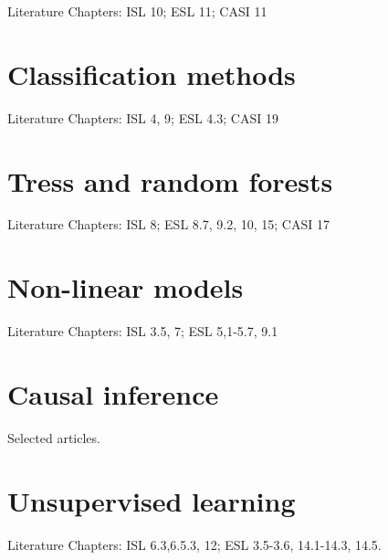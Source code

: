 \documentclass[11pt,a4paper]{article}
\begin{document}
Literature Chapters: ISL 10; ESL 11; CASI 11

\section{Classification methods}

Literature Chapters: ISL 4, 9; ESL 4.3; CASI 19

\section{Tress and random forests}

Literature Chapters: ISL 8; ESL 8.7, 9.2, 10, 15; CASI 17

\section{Non-linear models}

Literature Chapters: ISL 3.5, 7; ESL 5,1-5.7, 9.1

\section{Causal inference}

Selected articles.


\section{Unsupervised learning}

Literature Chapters: ISL 6.3,6.5.3, 12; ESL 3.5-3.6, 14.1-14.3, 14.5.


\printbibliography
\end{document}
